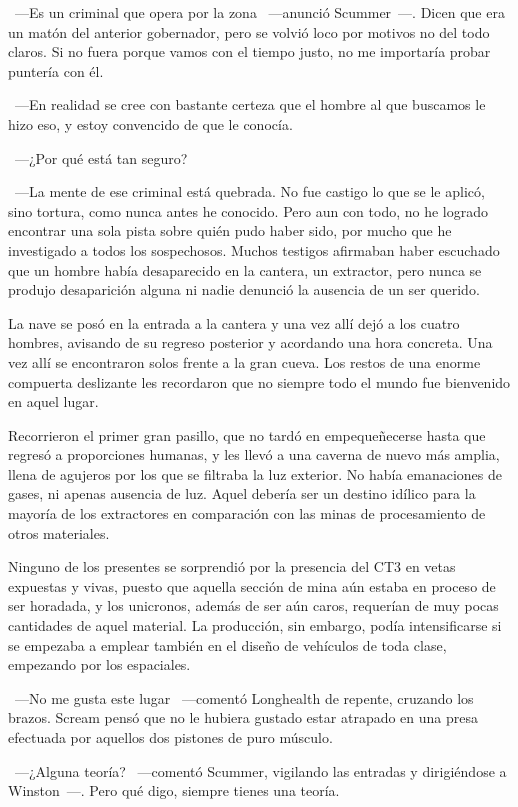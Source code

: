 ~---Es un criminal que opera por la zona ~---anunció Scummer~---. Dicen que era un matón del anterior gobernador, pero se volvió loco por motivos no del todo claros. Si no fuera porque vamos con el tiempo justo, no me importaría probar puntería con él.

~---En realidad se cree con bastante certeza que el hombre al que buscamos le hizo eso, y estoy convencido de que le conocía.

~---¿Por qué está tan seguro?

~---La mente de ese criminal está quebrada. No fue castigo lo que se le aplicó, sino tortura, como nunca antes he conocido. Pero aun con todo, no he logrado encontrar una sola pista sobre quién pudo haber sido, por mucho que he investigado a todos los sospechosos. Muchos testigos afirmaban haber escuchado que un hombre había desaparecido en la cantera, un extractor, pero nunca se produjo desaparición alguna ni nadie denunció la ausencia de un ser querido.

La nave se posó en la entrada a la cantera y una vez allí dejó a los cuatro hombres, avisando de su regreso posterior y acordando una hora concreta. Una vez allí se encontraron solos frente a la gran cueva. Los restos de una enorme compuerta deslizante les recordaron que no siempre todo el mundo fue bienvenido en aquel lugar.

Recorrieron el primer gran pasillo, que no tardó en empequeñecerse hasta que regresó a proporciones humanas, y les llevó a una caverna de nuevo más amplia, llena de agujeros por los que se filtraba la luz exterior. No había emanaciones de gases, ni apenas ausencia de luz. Aquel debería ser un destino idílico para la mayoría de los extractores en comparación con las minas de procesamiento de otros materiales.

Ninguno de los presentes se sorprendió por la presencia del CT3 en vetas expuestas y vivas, puesto que aquella sección de mina aún estaba en proceso de ser horadada, y los unicronos, además de ser aún caros, requerían de muy pocas cantidades de aquel material. La producción, sin embargo, podía intensificarse si se empezaba a emplear también en el diseño de vehículos de toda clase, empezando por los espaciales.

~---No me gusta este lugar ~---comentó Longhealth de repente, cruzando los brazos. Scream pensó que no le hubiera gustado estar atrapado en una presa efectuada por aquellos dos pistones de puro músculo.

~---¿Alguna teoría? ~---comentó Scummer, vigilando las entradas y dirigiéndose a Winston~---. Pero qué digo, siempre tienes una teoría.

